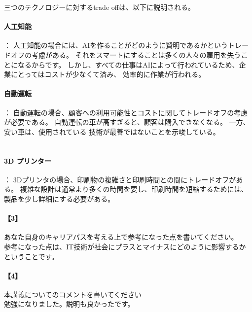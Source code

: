\documentclass[20 pts]{article}
\begin{document}
三つのテクノロジーに対するtrade offは、以下に説明される。
\paragraph{人工知能}：
人工知能の場合には、AIを作ることがどのように賢明であるかというトレードオフの考慮がある。 
それをスマートにすることは多くの人々の雇用を失うことになるからです。 
しかし、すべての仕事はAIによって行われているため、企業にとってはコストが少なくて済み、
効率的に作業が行われる。

\paragraph{自動運転}：
自動運転の場合、顧客への利用可能性とコストに関してトレードオフの考慮が必要である。 
自動運転の車が高すぎると、顧客は購入できなくなる。 一方、安い車は、使用されている
技術が最善ではないことを示唆している。
　　　　　　　　　
\paragraph{3D プリンター}：
3Dプリンタの場合、印刷物の複雑さと印刷時間との間にトレードオフがある。 
複雑な設計は通常より多くの時間を要し、印刷時間を短縮するためには、
製品を少し詳細にする必要がある。

\newpage
\paragraph{【3】}あなた自身のキャリアパスを考える上で参考になった点を書いてください。\\
参考になった点は、IT技術が社会にプラスとマイナスにどのように影響するかということです。



\paragraph{【4】}本講義についてのコメントを書いてください\\
勉強になりました。説明も良かったです。
\end{document}
